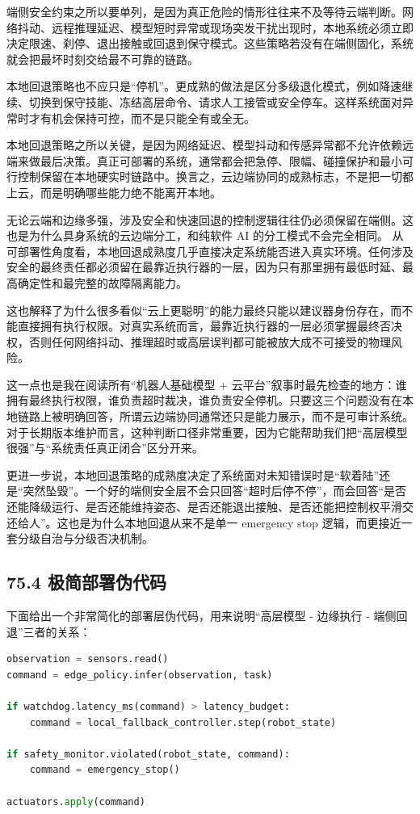 端侧安全约束之所以要单列，是因为真正危险的情形往往来不及等待云端判断。网络抖动、远程推理延迟、模型短时异常或现场突发干扰出现时，本地系统必须立即决定限速、刹停、退出接触或回退到保守模式。这些策略若没有在端侧固化，系统就会把最坏时刻交给最不可靠的链路。

本地回退策略也不应只是“停机”。更成熟的做法是区分多级退化模式，例如降速继续、切换到保守技能、冻结高层命令、请求人工接管或安全停车。这样系统面对异常时才有机会保持可控，而不是只能全有或全无。

本地回退策略之所以关键，是因为网络延迟、模型抖动和传感异常都不允许依赖远端来做最后决策。真正可部署的系统，通常都会把急停、限幅、碰撞保护和最小可行控制保留在本地硬实时链路中。换言之，云边端协同的成熟标志，不是把一切都上云，而是明确哪些能力绝不能离开本地。

无论云端和边缘多强，涉及安全和快速回退的控制逻辑往往仍必须保留在端侧。这也是为什么具身系统的云边端分工，和纯软件 AI 的分工模式不会完全相同。 从可部署性角度看，本地回退成熟度几乎直接决定系统能否进入真实环境。任何涉及安全的最终责任都必须留在最靠近执行器的一层，因为只有那里拥有最低时延、最高确定性和最完整的故障隔离能力。

这也解释了为什么很多看似“云上更聪明”的能力最终只能以建议器身份存在，而不能直接拥有执行权限。对真实系统而言，最靠近执行器的一层必须掌握最终否决权，否则任何网络抖动、推理超时或高层误判都可能被放大成不可接受的物理风险。

这一点也是我在阅读所有“机器人基础模型 + 云平台”叙事时最先检查的地方：谁拥有最终执行权限，谁负责超时裁决，谁负责安全停机。只要这三个问题没有在本地链路上被明确回答，所谓云边端协同通常还只是能力展示，而不是可审计系统。对于长期版本维护而言，这种判断口径非常重要，因为它能帮助我们把“高层模型很强”与“系统责任真正闭合”区分开来。

更进一步说，本地回退策略的成熟度决定了系统面对未知错误时是“软着陆”还是“突然坠毁”。一个好的端侧安全层不会只回答“超时后停不停”，而会回答“是否还能降级运行、是否还能维持姿态、是否还能退出接触、是否还能把控制权平滑交还给人”。这也是为什么本地回退从来不是单一 emergency stop 逻辑，而更接近一套分级自治与分级否决机制。

\subsection*{75.4 极简部署伪代码}


下面给出一个非常简化的部署层伪代码，用来说明“高层模型 - 边缘执行 - 端侧回退”三者的关系：

\begin{lstlisting}[language=python]
observation = sensors.read()
command = edge_policy.infer(observation, task)

if watchdog.latency_ms(command) > latency_budget:
    command = local_fallback_controller.step(robot_state)

if safety_monitor.violated(robot_state, command):
    command = emergency_stop()

actuators.apply(command)
\end{lstlisting}

